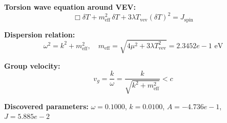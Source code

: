 
\textbf{Torsion wave equation around VEV:}
\begin{equation}
  \Box \delta T + m_{\text{eff}}^2 \, \delta T + 3\lambda T_{\text{vev}} (\delta T)^2 = J_{\text{spin}}
\end{equation}

\textbf{Dispersion relation:}
\begin{equation}
  \omega^2 = k^2 + m_{\text{eff}}^2, \quad
  m_{\text{eff}} = \sqrt{4\mu^2 + 3\lambda T_{\text{vev}}^2} = 2.3452e-1 \text{ eV}
\end{equation}

\textbf{Group velocity:}
\begin{equation}
  v_g = \frac{k}{\omega} = \frac{k}{\sqrt{k^2 + m_{\text{eff}}^2}} < c
\end{equation}

\textbf{Discovered parameters:}
$\omega = 0.1000$, \quad
$k = 0.0100$, \quad
$A = -4.736e-1$, \quad
$J = 5.885e-2$
